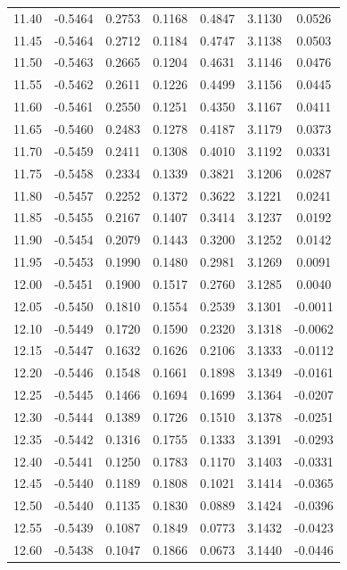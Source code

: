 \begin{longtable}{|c|c|c|c|c|c|c|}
11.40 & -0.5464 & 0.2753 & 0.1168 & 0.4847 & 3.1130 & 0.0526 \\
11.45 & -0.5464 & 0.2712 & 0.1184 & 0.4747 & 3.1138 & 0.0503 \\
11.50 & -0.5463 & 0.2665 & 0.1204 & 0.4631 & 3.1146 & 0.0476 \\
11.55 & -0.5462 & 0.2611 & 0.1226 & 0.4499 & 3.1156 & 0.0445 \\
11.60 & -0.5461 & 0.2550 & 0.1251 & 0.4350 & 3.1167 & 0.0411 \\
11.65 & -0.5460 & 0.2483 & 0.1278 & 0.4187 & 3.1179 & 0.0373 \\
11.70 & -0.5459 & 0.2411 & 0.1308 & 0.4010 & 3.1192 & 0.0331 \\
11.75 & -0.5458 & 0.2334 & 0.1339 & 0.3821 & 3.1206 & 0.0287 \\
11.80 & -0.5457 & 0.2252 & 0.1372 & 0.3622 & 3.1221 & 0.0241 \\
11.85 & -0.5455 & 0.2167 & 0.1407 & 0.3414 & 3.1237 & 0.0192 \\
11.90 & -0.5454 & 0.2079 & 0.1443 & 0.3200 & 3.1252 & 0.0142 \\
11.95 & -0.5453 & 0.1990 & 0.1480 & 0.2981 & 3.1269 & 0.0091 \\
12.00 & -0.5451 & 0.1900 & 0.1517 & 0.2760 & 3.1285 & 0.0040 \\
12.05 & -0.5450 & 0.1810 & 0.1554 & 0.2539 & 3.1301 & -0.0011 \\
12.10 & -0.5449 & 0.1720 & 0.1590 & 0.2320 & 3.1318 & -0.0062 \\
12.15 & -0.5447 & 0.1632 & 0.1626 & 0.2106 & 3.1333 & -0.0112 \\
12.20 & -0.5446 & 0.1548 & 0.1661 & 0.1898 & 3.1349 & -0.0161 \\
12.25 & -0.5445 & 0.1466 & 0.1694 & 0.1699 & 3.1364 & -0.0207 \\
12.30 & -0.5444 & 0.1389 & 0.1726 & 0.1510 & 3.1378 & -0.0251 \\
12.35 & -0.5442 & 0.1316 & 0.1755 & 0.1333 & 3.1391 & -0.0293 \\
12.40 & -0.5441 & 0.1250 & 0.1783 & 0.1170 & 3.1403 & -0.0331 \\
12.45 & -0.5440 & 0.1189 & 0.1808 & 0.1021 & 3.1414 & -0.0365 \\
12.50 & -0.5440 & 0.1135 & 0.1830 & 0.0889 & 3.1424 & -0.0396 \\
12.55 & -0.5439 & 0.1087 & 0.1849 & 0.0773 & 3.1432 & -0.0423 \\
12.60 & -0.5438 & 0.1047 & 0.1866 & 0.0673 & 3.1440 & -0.0446 \\

\end{longtable}
